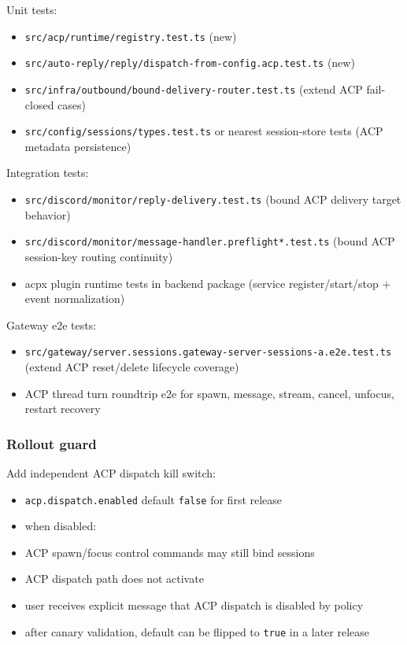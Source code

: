 Unit tests:

\begin{itemize}
  \item \texttt{src/acp/runtime/registry.test.ts} (new)
  \item \texttt{src/auto-reply/reply/dispatch-from-config.acp.test.ts} (new)
  \item \texttt{src/infra/outbound/bound-delivery-router.test.ts} (extend ACP fail-closed cases)
  \item \texttt{src/config/sessions/types.test.ts} or nearest session-store tests (ACP metadata persistence)
\end{itemize}


Integration tests:

\begin{itemize}
  \item \texttt{src/discord/monitor/reply-delivery.test.ts} (bound ACP delivery target behavior)
  \item \texttt{src/discord/monitor/message-handler.preflight*.test.ts} (bound ACP session-key routing continuity)
  \item acpx plugin runtime tests in backend package (service register/start/stop + event normalization)
\end{itemize}


Gateway e2e tests:

\begin{itemize}
  \item \texttt{src/gateway/server.sessions.gateway-server-sessions-a.e2e.test.ts} (extend ACP reset/delete lifecycle coverage)
  \item ACP thread turn roundtrip e2e for spawn, message, stream, cancel, unfocus, restart recovery
\end{itemize}


\subsubsection{Rollout guard}


Add independent ACP dispatch kill switch:

\begin{itemize}
  \item \texttt{acp.dispatch.enabled} default \texttt{false} for first release
  \item when disabled:
  \item ACP spawn/focus control commands may still bind sessions
  \item ACP dispatch path does not activate
  \item user receives explicit message that ACP dispatch is disabled by policy
  \item after canary validation, default can be flipped to \texttt{true} in a later release
\end{itemize}


